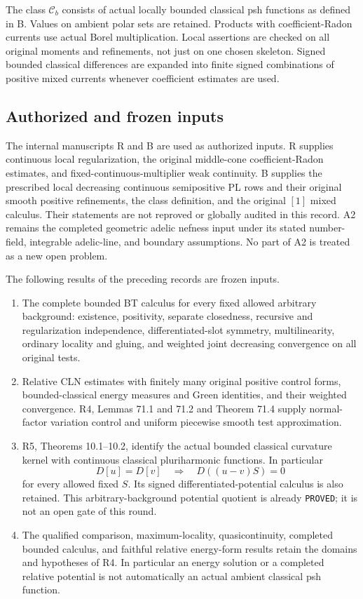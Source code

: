 \documentclass[11pt,a4paper]{article}
\numberwithin{equation}{section}
\theoremstyle{definition}
\theoremstyle{remark}
\begin{document}
The class $\mathcal C_b$ consists of actual locally bounded classical
psh functions as defined in B. Values on ambient polar sets are
retained. Products with coefficient-Radon currents use actual Borel
multiplication. Local assertions are checked on all original moments
and refinements, not just on one chosen skeleton. Signed bounded
classical differences are expanded into finite signed combinations of
positive mixed currents whenever coefficient estimates are used.

\subsection{Authorized and frozen inputs}

The internal manuscripts R and B are used as authorized inputs.
R supplies continuous local regularization, the original middle-cone
coefficient-Radon estimates, and fixed-continuous-multiplier weak
continuity. B supplies the prescribed local decreasing continuous
semipositive PL rows and their original smooth positive refinements,
the class definition, and the original $[1]$ mixed calculus. Their
statements are not reproved or globally audited in this record.
A2 remains the completed geometric adelic nefness input under its
stated number-field, integrable adelic-line, and boundary assumptions.
No part of A2 is treated as a new open problem.

The following results of the preceding records are frozen inputs.
\begin{enumerate}
\item The complete bounded BT calculus for every fixed allowed
      arbitrary background: existence, positivity, separate closedness,
      recursive and regularization independence, differentiated-slot
      symmetry, multilinearity, ordinary locality and gluing, and
      weighted joint decreasing convergence on all original tests.
\item Relative CLN estimates with finitely many original positive
      control forms, bounded-classical energy measures and Green
      identities, and their weighted convergence. R4, Lemmas 71.1
      and 71.2 and Theorem 71.4 supply normal-factor variation control
      and uniform piecewise smooth test approximation.
\item R5, Theorems 10.1--10.2, identify the actual bounded classical
      curvature kernel with continuous classical pluriharmonic
      functions. In particular
      \[
           D[u]=D[v]\quad\Longrightarrow\quad D((u-v)S)=0
      \]
      for every allowed fixed $S$. Its signed differentiated-potential
      calculus is also retained. This arbitrary-background potential
      quotient is already \texttt{PROVED}; it is not an open gate
      of this round.
\item The qualified comparison, maximum-locality, quasicontinuity,
      completed bounded calculus, and faithful relative energy-form
      results retain the domains and hypotheses of R4. In particular
      an energy solution or a completed relative potential is not
      automatically an actual ambient classical psh function.
\end{enumerate}
\end{document}
